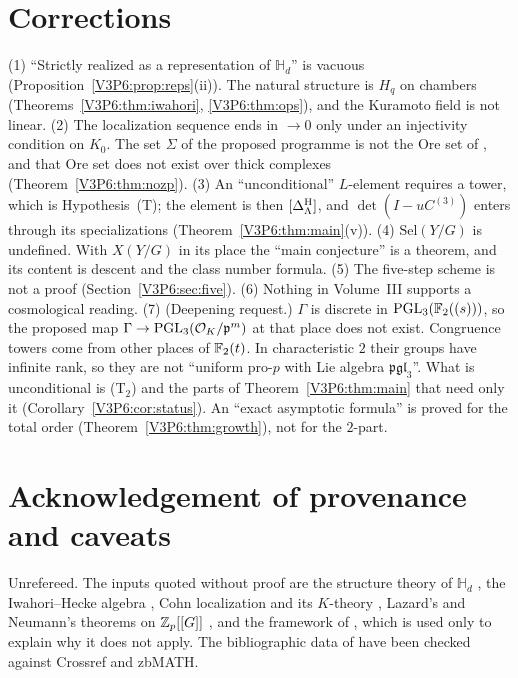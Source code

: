 \section{Corrections}\label{V3P6:sec:scope}

\begin{remark}\label{V3P6:rem:corrections}
(1) ``Strictly realized as a representation of $\mathbb H_d$'' is vacuous
(Proposition~\ref{V3P6:prop:reps}(ii)). The natural structure is $H_q$ on chambers
(Theorems~\ref{V3P6:thm:iwahori}, \ref{V3P6:thm:ops}), and the Kuramoto field is not linear.
(2) The localization sequence ends in $\to0$ only under an injectivity condition on $K_0$. The
set $\Sigma$ of the proposed programme is not the Ore set of \cite{CFKSV}, and that Ore set does not
exist over thick complexes (Theorem~\ref{V3P6:thm:nozp}). (3) An ``unconditional'' $L$-element
requires a tower, which is Hypothesis~(T); the element is then $[\Delta^{\mathrm{H}}_\Lambda]$, and
$\det(I-uC^{(3)})$ enters through its specializations (Theorem~\ref{V3P6:thm:main}(v)). (4)
$\mathrm{Sel}(Y/G)$ is undefined. With $X(Y/G)$ in its place the ``main conjecture'' is a
theorem, and its content is descent and the class number formula. (5) The five-step scheme is
not a proof (Section~\ref{V3P6:sec:five}). (6) Nothing in Volume~III supports a
cosmological reading. (7) (Deepening request.) $\Gamma$ is discrete in
$\mathrm{PGL}_3(\mathbb{F}_2((s)))$, so the proposed map $\Gamma\to\mathrm{PGL}_3(\mathcal O_K/\mathfrak p^{m})$ at that
place does not exist. Congruence towers come from other places of $\mathbb{F}_2(t)$. In
characteristic $2$ their groups have infinite rank, so they are not ``uniform pro-$p$ with Lie
algebra $\mathfrak{pgl}_3$''. What is unconditional is (T$_2$) and the parts of
Theorem~\ref{V3P6:thm:main} that need only it (Corollary~\ref{V3P6:cor:status}). An ``exact
asymptotic formula'' is proved for the total order (Theorem~\ref{V3P6:thm:growth}), not for the
$2$-part.
\end{remark}

\section*{Acknowledgement of provenance and caveats}

Unrefereed. The inputs quoted without proof are the structure theory of $\mathbb H_d$
\cite{Dri86,Lus89}, the Iwahori--Hecke algebra \cite{IM65}, Cohn localization and its
$K$-theory \cite{Coh85,NR04}, Lazard's and Neumann's theorems on $\mathbb{Z}_p[[G]]$ \cite{Laz65,Neu88},
and the framework of \cite{CFKSV}, which is used only to explain why it does not apply. The
bibliographic data of \cite{Dri86,Lus89,IM65,Coh85,NR04,Neu88} have been checked against Crossref and zbMATH.


